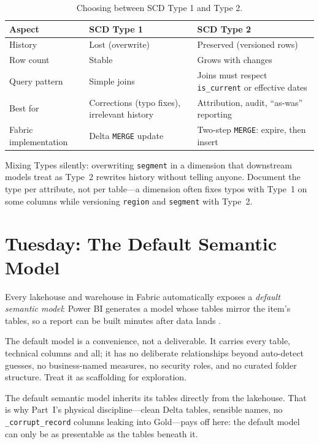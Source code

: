 \begin{table}[H]
\centering
\small
\begin{tabular}{@{}p{3.4cm}p{5.2cm}p{5.2cm}@{}}
\toprule
\textbf{Aspect} & \textbf{SCD Type 1} & \textbf{SCD Type 2} \\
\midrule
History & Lost (overwrite) & Preserved (versioned rows) \\
Row count & Stable & Grows with changes \\
Query pattern & Simple joins & Joins must respect \texttt{is\_current} or effective dates \\
Best for & Corrections (typo fixes), irrelevant history & Attribution, audit, ``as-was'' reporting \\
Fabric implementation & Delta \texttt{MERGE} update & Two-step \texttt{MERGE}: expire, then insert \\
\bottomrule
\end{tabular}
\caption{Choosing between SCD Type 1 and Type 2.}
\label{tab:chapter7-scd}
\end{table}

\begin{pitfall}
Mixing Types silently: overwriting \texttt{segment} in a dimension that downstream models treat as Type~2 rewrites history without telling anyone. Document the type per attribute, not per table---a dimension often fixes typos with Type~1 on some columns while versioning \texttt{region} and \texttt{segment} with Type~2.
\end{pitfall}

\section{Tuesday: The Default Semantic Model}
Every lakehouse and warehouse in Fabric automatically exposes a \emph{default semantic model}: Power BI generates a model whose tables mirror the item's tables, so a report can be built minutes after data lands \cite{microsoftFabricSemanticModels}.

The default model is a convenience, not a deliverable. It carries every table, technical columns and all; it has no deliberate relationships beyond auto-detect guesses, no business-named measures, no security roles, and no curated folder structure. Treat it as scaffolding for exploration.

\begin{notebox}
The default semantic model inherits its tables directly from the lakehouse. That is why Part~I's physical discipline---clean Delta tables, sensible names, no \texttt{\_corrupt\_record} columns leaking into Gold---pays off here: the default model can only be as presentable as the tables beneath it.
\end{notebox}

